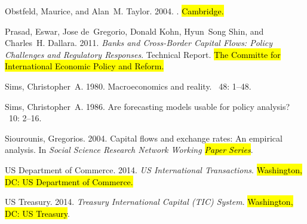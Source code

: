 \documentclass[jrfm,article,accept,moreauthors,pdftex]{Definitions/mdpi}
\begin{document}
\begin{thebibliography}{999}
Obstfeld, Maurice, and Alan~M. Taylor. 2004.
.
\newblock \hl{Cambridge.} %

Prasad, Eswar, Jose de~Gregorio, Donald Kohn, Hyun~Song Shin, and Charles~H.
  Dallara. 2011.
\newblock \emph{Banks and Cross-Border Capital Flows: Policy Challenges and
  Regulatory Responses}.
\newblock Technical Report. \hl{The Committe for International Economic Policy and
  Reform.} %


Sims, Christopher~A. 1980.
\newblock Macroeconomics and reality.
~{48}: 1--48.

Sims, Christopher~A. 1986.
\newblock Are forecasting models usable for policy analysis?
~{10}: 2--16.

Siourounis, Gregorios. 2004.
\newblock Capital flows and exchange rates: An empirical analysis.
\newblock In {\em Social Science Research Network Working \hl{Paper Series}}. %

{{US} Department of Commerce}. 2014.
\newblock \emph{US International Transactions}. \hl{Washington, DC: US Department of Commerce.}%

{{US} Treasury}. 2014.
\newblock \emph{Treasury International Capital (TIC) System}. \hl{Washington, DC: US Treasury}.%

\end{thebibliography}



\end{document}
